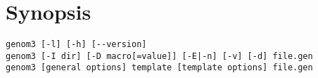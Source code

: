 %
%
%
%
%

\section{Synopsis}

\begin{verbatim}
genom3 [-l] [-h] [--version]
genom3 [-I dir] [-D macro[=value]] [-E|-n] [-v] [-d] file.gen
genom3 [general options] template [template options] file.gen
\end{verbatim}


